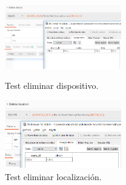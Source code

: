 \begin{figure}[!htb]
\includegraphics[width=2.00in]{images/tests/screenshots/13deletedevice.PNG}
\caption{Test eliminar dispositivo.}
\endminipage\hfill
{}
\includegraphics[width=2.00in]{images/tests/screenshots/14deletelocation.PNG}
\caption{Test eliminar localización.}
\endminipage\hfill
\end{figure}



\newpage \thispagestyle{empty} %